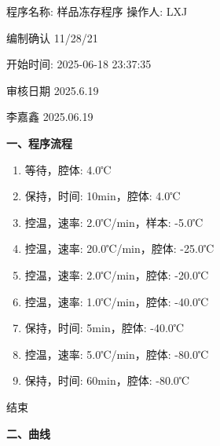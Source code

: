 \documentclass[UTF8,10pt,a4paper,fontset=fandol]{ctexart}
\newcommand{\fieldvalue}[1]{#1}
\newcommand{\handwritten}[1]{#1}
\begin{document}
\noindent
程序名称:
\fieldvalue{样品冻存程序}
\hfill
操作人:
\fieldvalue{LXJ}

\handwritten{编制确认}
\hfill
\handwritten{11/28/21}

\vspace{1em}

\noindent
开始时间:
\fieldvalue{2025-06-18 23:37:35}

\vspace{0.5em}

\handwritten{审核日期}
\hfill
\handwritten{2025.6.19}

\handwritten{李嘉鑫}
\hfill
\handwritten{2025.06.19}

\vspace{1em}

\noindent\textbf{一、程序流程}

\begin{enumerate}
    \item 等待，腔体: 4.0℃
    \item 保持，时间: 10min，腔体: 4.0℃
    \item 控温，速率: 2.0℃/min，样本: -5.0℃
    \item 控温，速率: 20.0℃/min，腔体: -25.0℃
    \item 控温，速率: 2.0℃/min，腔体: -20.0℃
    \item 控温，速率: 1.0℃/min，腔体: -40.0℃
    \item 保持，时间: 5min，腔体: -40.0℃
    \item 控温，速率: 5.0℃/min，腔体: -80.0℃
    \item 保持，时间: 60min，腔体: -80.0℃
\end{enumerate}

\noindent 结束

\vspace{0.25em}

\noindent\textbf{二、曲线}

\vspace{0.5em}
\end{document}
